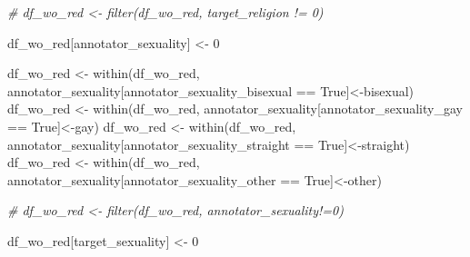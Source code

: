 \documentclass[
]{article}
\newenvironment{Shaded}{\begin{snugshade}}{\end{snugshade}}
\newcommand{\CommentTok}[1]{\textcolor[rgb]{0.56,0.35,0.01}{\textit{#1}}}
\newcommand{\DecValTok}[1]{\textcolor[rgb]{0.00,0.00,0.81}{#1}}
\newcommand{\FunctionTok}[1]{\textcolor[rgb]{0.00,0.00,0.00}{#1}}
\newcommand{\NormalTok}[1]{#1}
\newcommand{\OtherTok}[1]{\textcolor[rgb]{0.56,0.35,0.01}{#1}}
\newcommand{\SpecialCharTok}[1]{\textcolor[rgb]{0.00,0.00,0.00}{#1}}
\newcommand{\StringTok}[1]{\textcolor[rgb]{0.31,0.60,0.02}{#1}}
\begin{document}
\begin{Shaded}
\begin{Highlighting}[]
\CommentTok{\# df\_wo\_red \textless{}{-} filter(df\_wo\_red, target\_religion != 0)}



\NormalTok{df\_wo\_red[}\StringTok{\textquotesingle{}annotator\_sexuality\textquotesingle{}}\NormalTok{] }\OtherTok{\textless{}{-}} \DecValTok{0}

\NormalTok{df\_wo\_red }\OtherTok{\textless{}{-}} \FunctionTok{within}\NormalTok{(df\_wo\_red, annotator\_sexuality[annotator\_sexuality\_bisexual }\SpecialCharTok{==} \StringTok{\textquotesingle{}True\textquotesingle{}}\NormalTok{]}\OtherTok{\textless{}{-}}\StringTok{\textquotesingle{}bisexual\textquotesingle{}}\NormalTok{)}
\NormalTok{df\_wo\_red }\OtherTok{\textless{}{-}} \FunctionTok{within}\NormalTok{(df\_wo\_red, annotator\_sexuality[annotator\_sexuality\_gay }\SpecialCharTok{==} \StringTok{\textquotesingle{}True\textquotesingle{}}\NormalTok{]}\OtherTok{\textless{}{-}}\StringTok{\textquotesingle{}gay\textquotesingle{}}\NormalTok{)}
\NormalTok{df\_wo\_red }\OtherTok{\textless{}{-}} \FunctionTok{within}\NormalTok{(df\_wo\_red, annotator\_sexuality[annotator\_sexuality\_straight }\SpecialCharTok{==} \StringTok{\textquotesingle{}True\textquotesingle{}}\NormalTok{]}\OtherTok{\textless{}{-}}\StringTok{\textquotesingle{}straight\textquotesingle{}}\NormalTok{)}
\NormalTok{df\_wo\_red }\OtherTok{\textless{}{-}} \FunctionTok{within}\NormalTok{(df\_wo\_red, annotator\_sexuality[annotator\_sexuality\_other }\SpecialCharTok{==} \StringTok{\textquotesingle{}True\textquotesingle{}}\NormalTok{]}\OtherTok{\textless{}{-}}\StringTok{\textquotesingle{}other\textquotesingle{}}\NormalTok{)}

\CommentTok{\# df\_wo\_red \textless{}{-} filter(df\_wo\_red, annotator\_sexuality!=0)}


\NormalTok{df\_wo\_red[}\StringTok{\textquotesingle{}target\_sexuality\textquotesingle{}}\NormalTok{] }\OtherTok{\textless{}{-}} \DecValTok{0}


\end{Highlighting}
\end{Shaded}
\end{document}

